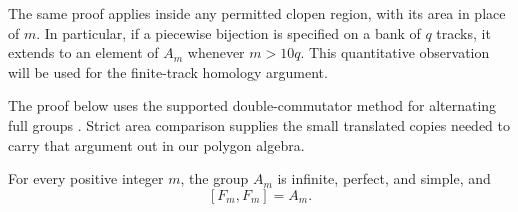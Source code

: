 The same proof applies inside any permitted clopen region, with its
area in place of $m$. In particular, if a piecewise bijection is
specified on a bank of $q$ tracks, it extends to an element of $A_m$
whenever $m>10q$. This quantitative observation will be used for the
finite-track homology argument.

The proof below uses the supported double-commutator method for
alternating full groups \cite[Theorem~4.1 and its proof]{Nekrashevych2019}.
Strict area comparison supplies the small translated copies needed
to carry that argument out in our polygon algebra.

\begin{theorem}\label{thm:simplicity}
For every positive integer $m$, the group $A_m$ is infinite, perfect,
and simple, and
\[
 [F_m,F_m]=A_m.
\]
\end{theorem}

